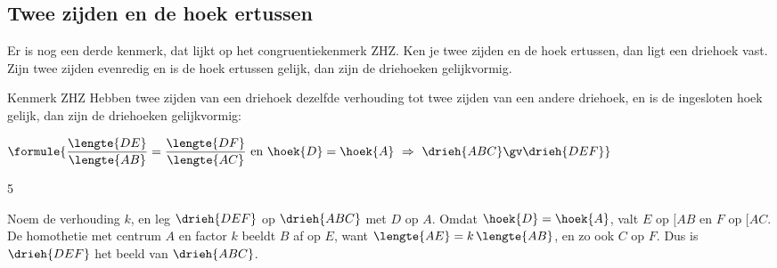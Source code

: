 \begin{oefeningen}
\end{oefeningen}

\subsection{Twee zijden en de hoek ertussen}

Er is nog een derde kenmerk, dat lijkt op het congruentiekenmerk ZHZ. Ken je twee zijden en de hoek ertussen, dan ligt een driehoek vast. Zijn twee zijden evenredig en is de hoek ertussen gelijk, dan zijn de driehoeken gelijkvormig.

\begin{theorie}
\begin{minipage}[t]{.62\linewidth}
\vspace{0pt}
\begin{stelling}{Kenmerk ZHZ}
Hebben twee zijden van een driehoek dezelfde verhouding tot twee zijden van een andere driehoek, en is de ingesloten hoek gelijk, dan zijn de driehoeken gelijkvormig:

\vspace{1mm}
\qquad $\formule{\dfrac{\lengte{DE}}{\lengte{AB}} = \dfrac{\lengte{DF}}{\lengte{AC}} \text{ en } \hoek{D} = \hoek{A} \ \Rightarrow \ \drieh{ABC} \gv \drieh{DEF}}$
\end{stelling}
\begin{alleenvoor}{5}

\begin{bewijs}
Noem de verhouding $k$, en leg $\drieh{DEF}$ op $\drieh{ABC}$ met $D$ op $A$. Omdat $\hoek{D} = \hoek{A}$, valt $E$ op $[AB$ en $F$ op $[AC$. De homothetie met centrum $A$ en factor $k$ beeldt $B$ af op $E$, want $\lengte{AE} = k\,\lengte{AB}$, en zo ook $C$ op $F$. Dus is $\drieh{DEF}$ het beeld van $\drieh{ABC}$.
\end{bewijs}
\end{alleenvoor}
\end{minipage}\hfill
\begin{minipage}[t]{.34\linewidth}
\vspace{0pt}
\centering
{}
\end{minipage}
\end{theorie}

